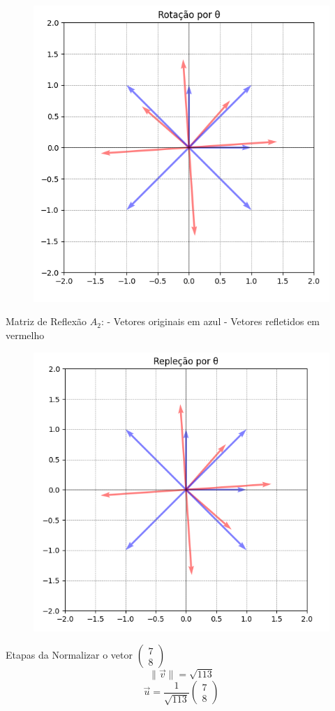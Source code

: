 \begin{figure}
    \centering
    \includegraphics[width=0.75\linewidth]{image7.png}
\end{figure}
Matriz de Reflexão \(A_2\):
- Vetores originais em azul
- Vetores refletidos em vermelho
\begin{figure}
    \centering
    \includegraphics[width=0.75\linewidth]{image8.png}
\end{figure}
Etapas da 
Normalizar o vetor \(\begin{pmatrix} 7 \\ 8 \end{pmatrix}\)
\[
\|\vec{v}\| = \sqrt{113}
\]
\[
\vec{u} = \frac{1}{\sqrt{113}} \begin{pmatrix} 7 \\ 8 \end{pmatrix}
\]
